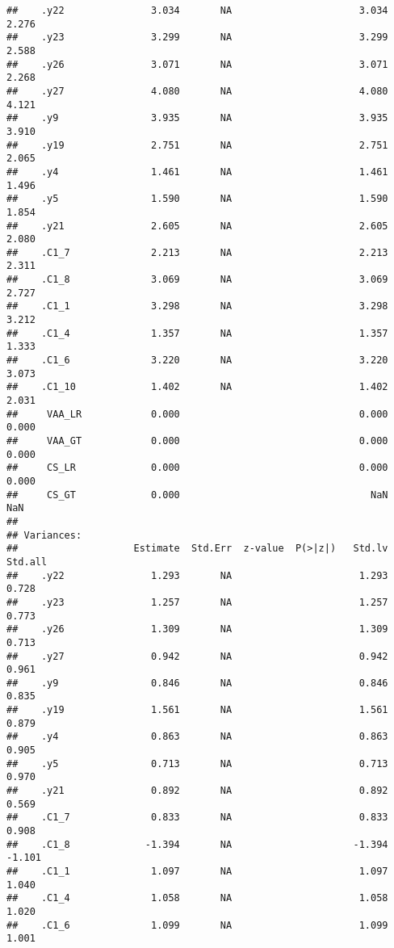\documentclass[
]{article}
\begin{document}
\begin{verbatim}
##    .y22               3.034       NA                      3.034    2.276
##    .y23               3.299       NA                      3.299    2.588
##    .y26               3.071       NA                      3.071    2.268
##    .y27               4.080       NA                      4.080    4.121
##    .y9                3.935       NA                      3.935    3.910
##    .y19               2.751       NA                      2.751    2.065
##    .y4                1.461       NA                      1.461    1.496
##    .y5                1.590       NA                      1.590    1.854
##    .y21               2.605       NA                      2.605    2.080
##    .C1_7              2.213       NA                      2.213    2.311
##    .C1_8              3.069       NA                      3.069    2.727
##    .C1_1              3.298       NA                      3.298    3.212
##    .C1_4              1.357       NA                      1.357    1.333
##    .C1_6              3.220       NA                      3.220    3.073
##    .C1_10             1.402       NA                      1.402    2.031
##     VAA_LR            0.000                               0.000    0.000
##     VAA_GT            0.000                               0.000    0.000
##     CS_LR             0.000                               0.000    0.000
##     CS_GT             0.000                                 NaN      NaN
## 
## Variances:
##                    Estimate  Std.Err  z-value  P(>|z|)   Std.lv  Std.all
##    .y22               1.293       NA                      1.293    0.728
##    .y23               1.257       NA                      1.257    0.773
##    .y26               1.309       NA                      1.309    0.713
##    .y27               0.942       NA                      0.942    0.961
##    .y9                0.846       NA                      0.846    0.835
##    .y19               1.561       NA                      1.561    0.879
##    .y4                0.863       NA                      0.863    0.905
##    .y5                0.713       NA                      0.713    0.970
##    .y21               0.892       NA                      0.892    0.569
##    .C1_7              0.833       NA                      0.833    0.908
##    .C1_8             -1.394       NA                     -1.394   -1.101
##    .C1_1              1.097       NA                      1.097    1.040
##    .C1_4              1.058       NA                      1.058    1.020
##    .C1_6              1.099       NA                      1.099    1.001

\end{verbatim}
\end{document}
